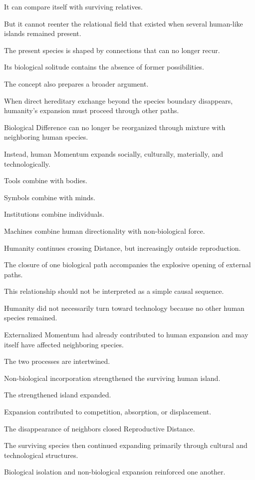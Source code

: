 It can compare itself with surviving relatives.

But it cannot reenter the relational field that existed when several human-like islands remained present.

The present species is shaped by connections that can no longer recur.

Its biological solitude contains the absence of former possibilities.

The concept also prepares a broader argument.

When direct hereditary exchange beyond the species boundary disappears, humanity’s expansion must proceed through other paths.

Biological Difference can no longer be reorganized through mixture with neighboring human species.

Instead, human Momentum expands socially, culturally, materially, and technologically.

Tools combine with bodies.

Symbols combine with minds.

Institutions combine individuals.

Machines combine human directionality with non-biological force.

Humanity continues crossing Distance, but increasingly outside reproduction.

The closure of one biological path accompanies the explosive opening of external paths.

This relationship should not be interpreted as a simple causal sequence.

Humanity did not necessarily turn toward technology because no other human species remained.

Externalized Momentum had already contributed to human expansion and may itself have affected neighboring species.

The two processes are intertwined.

Non-biological incorporation strengthened the surviving human island.

The strengthened island expanded.

Expansion contributed to competition, absorption, or displacement.

The disappearance of neighbors closed Reproductive Distance.

The surviving species then continued expanding primarily through cultural and technological structures.

Biological isolation and non-biological expansion reinforced one another.

